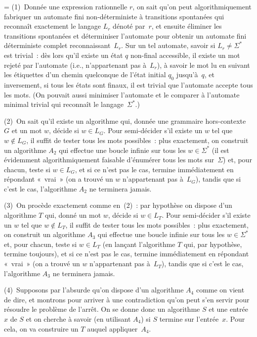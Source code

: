 \documentclass[12pt,a4paper]{article}
\theoremstyle{definition}
\newif\ifcorrige
\newenvironment{corrige}%
{\ifcorrige\relax\else\setbox0=\vbox\bgroup\fi%
\smallbreak\footnotesize\noindent{\underbar{\textit{Corrigé.}}\quad}}
{{\hbox{}\nobreak\hfill\checkmark}%
\ifcorrige\relax\else\egroup\fi\par}
\begin{document}
\begin{corrige}
(1) Donnée une expression rationnelle $r$, on sait qu'on peut
  algorithmiquement fabriquer un automate fini non-déterministe à
  transitions spontanées qui reconnaît exactement le langage $L_r$
  dénoté par $r$, et ensuite éliminer les transitions spontanées et
  déterminiser l'automate pour obtenir un automate fini déterministe
  complet reconnaissant $L_r$.  Sur un tel automate, savoir si $L_r
  \neq \Sigma^*$ est trivial : dès lors qu'il existe un état $q$
  non-final accessible, il existe un mot rejeté par l'automate (i.e.,
  n'appartenant pas à $L_r$), à savoir le mot lu en suivant les
  étiquettes d'un chemin quelconque de l'état initial $q_0$
  jusqu'à $q$, et inversement, si tous les états sont finaux, il est
  trivial que l'automate accepte tous les mots.  (On pouvait aussi
  minimiser l'automate et le comparer à l'automate minimal trivial qui
  reconnaît le langage $\Sigma^*$.)

\smallbreak

(2) On sait qu'il existe un algorithme qui, donnée une grammaire
hors-contexte $G$ et un mot $w$, décide si $w \in L_G$.  Pour
semi-décider s'il existe un $w$ tel que $w \not\in L_G$, il suffit de
tester tous les mots possibles : plus exactement, on construit un
algorithme $A_2$ qui effectue une boucle infinie sur tous les
$w\in\Sigma^*$ (il est évidemment algorithmiquement faisable
d'énumérer tous les mots sur $\Sigma$) et, pour chacun, teste si $w
\in L_G$, et si ce n'est pas le cas, termine immédiatement en
répondant « vrai » (on a trouvé un $w$ n'appartenant pas à $L_G$),
tandis que si c'est le cas, l'algorithme $A_2$ ne terminera jamais.

\smallbreak

(3) On procède exactement comme en (2) : par hypothèse on dispose d'un
algorithme $T$ qui, donné un mot $w$, décide si $w \in L_T$.  Pour
semi-décider s'il existe un $w$ tel que $w \not\in L_T$, il suffit de
tester tous les mots possibles : plus exactement, on construit un
algorithme $A_3$ qui effectue une boucle infinie sur tous les
$w\in\Sigma^*$ et, pour chacun, teste si $w \in L_T$ (en lançant
l'algorithme $T$ qui, par hypothèse, termine toujours), et si ce n'est
pas le cas, termine immédiatement en répondant « vrai » (on a trouvé
un $w$ n'appartenant pas à $L_T$), tandis que si c'est le cas,
l'algorithme $A_3$ ne terminera jamais.

\smallbreak

(4) Supposons par l'absurde qu'on dispose d'un algorithme $A_4$ comme
on vient de dire, et montrons pour arriver à une contradiction qu'on
peut s'en servir pour résoudre le problème de l'arrêt.  On se donne
donc un algorithme $S$ et une entrée $x$ de $S$ et on cherche à savoir
(en utilisant $A_4$) si $S$ termine sur l'entrée $x$.  Pour cela, on
va construire un $T$ auquel appliquer $A_4$.


\end{corrige}
\end{document}
